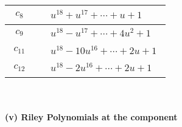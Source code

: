 \documentclass[1p]{elsarticle_modified}
\theoremstyle{definition}
\begin{document}
\begin{tabular}{m{50pt}|m{274pt}}
\hline $$\begin{aligned}c_{8}\end{aligned}$$&$\begin{aligned}
&u^{18}+u^{17}+\cdots+u+1
\end{aligned}$\\
\hline $$\begin{aligned}c_{9}\end{aligned}$$&$\begin{aligned}
&u^{18}- u^{17}+\cdots+4 u^2+1
\end{aligned}$\\
\hline $$\begin{aligned}c_{11}\end{aligned}$$&$\begin{aligned}
&u^{18}-10 u^{16}+\cdots+2 u+1
\end{aligned}$\\
\hline $$\begin{aligned}c_{12}\end{aligned}$$&$\begin{aligned}
&u^{18}-2 u^{16}+\cdots+2 u+1
\end{aligned}$\\
\hline
\end{tabular}\\~\\
\newpage\renewcommand{\arraystretch}{1}
\flushleft \textbf{(v) Riley Polynomials at the component}\newline \\
\end{document}

